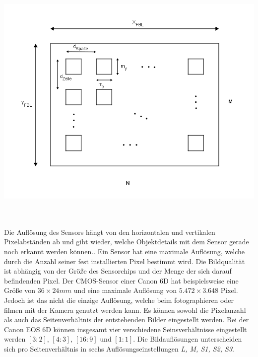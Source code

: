 \begin{minipage}{\linewidth}
	\centering
	\includegraphics[width=.8\linewidth]{images/Bildsensor_mit_Pixel.png}
\end{minipage}\\ \\


Die Auflösung des Sensors hängt von den horizontalen und vertikalen Pixelabständen ab und gibt wieder, welche Objektdetails mit dem Sensor gerade noch erkannt werden können.\cite{Photonik}. Ein Sensor hat eine maximale Auflösung, welche durch die Anzahl seiner fest installierten Pixel bestimmt wird. Die Bildqualität ist abhängig von der Größe des Sensorchips und der Menge der sich darauf befindenden Pixel. Der CMOS-Sensor einer Canon 6D hat beispielsweise eine Größe von $36 \times 24 mm$ und eine maximale Auflösung von $5.472 \times 3.648$ Pixel. Jedoch ist das nicht die einzige Auflösung, welche beim fotographieren oder filmen mit der Kamera genutzt werden kann. Es können sowohl die Pixelanzahl als auch das Seitenverhältnis der entstehenden Bilder eingestellt werden. Bei der Canon EOS 6D können insgesamt vier verschiedene Seinsverhältnisse eingestellt werden $[3:2], \,[4:3], \,[16:9]$ und $[1:1]$\cite{Canon6D}. Die Bildauflösungen unterscheiden sich pro Seitenverhältnis in sechs Auflösungseinstellungen \textit{L, M, S1, S2, S3}. 

